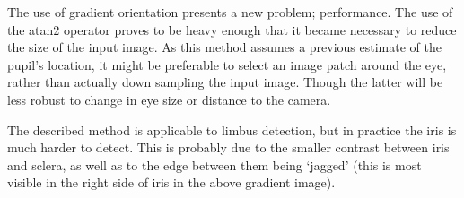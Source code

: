 The use of gradient orientation presents a new problem; performance. The use of
the atan2 operator proves to be heavy enough that it became necessary to reduce
the size of the input image. As this method assumes a previous estimate of the
pupil’s location, it might be preferable to select an image patch around the
eye, rather than actually down sampling the input image. Though the latter will
be less robust to change in eye size or distance to the camera.

The described method is applicable to limbus detection, but in practice the
iris is much harder to detect. This is probably due to the smaller contrast
between iris and sclera, as well as to the edge between them being ‘jagged’
(this is most visible in the right side of iris in the above gradient image).
